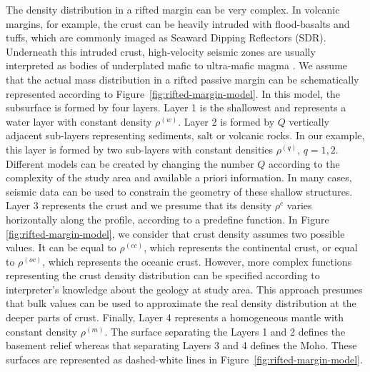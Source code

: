 \documentclass[manuscript]{geophysics}
\begin{document}
The density distribution in a rifted margin can be very complex.
In volcanic margins, for example, the crust can be heavily intruded with
flood-basalts and tuffs, which are commonly imaged as Seaward Dipping Reflectors (SDR).
Underneath this intruded crust, high-velocity seismic zones are usually interpreted 
as bodies of underplated mafic to ultra-mafic magma \citep{geoffroy2005}.
We assume that the actual mass distribution in a rifted passive margin can be 
schematically represented according to Figure~\ref{fig:rifted-margin-model}. 
In this model, the subsurface is formed by four layers. 
Layer 1 is the shallowest and represents a water layer with constant density
$\rho^{(w)}$. 
Layer 2 is formed by $Q$ vertically adjacent sub-layers representing 
sediments, salt or volcanic rocks.
In our example, this layer is formed by two sub-layers with constant densities
$\rho^{(q)}$, $q = 1, 2$. Different models can be created by changing the number $Q$
according to the complexity of the study area and available a priori information.
In many cases, seismic data can be used to constrain the geometry of these 
shallow structures.
Layer 3 represents the crust and we presume that its density $\rho^{c}$
varies horizontally along the profile, according to a predefine function.
In Figure \ref{fig:rifted-margin-model}, we consider that crust density assumes 
two possible values. It can be equal to $\rho^{(cc)}$, which
represents the continental crust, or equal to $\rho^{(oc)}$, which represents the
oceanic crust.
However, more complex functions representing the crust density distribution can be
specified according to interpreter's knowledge about the geology at study area.
This approach presumes that bulk values can be used 
to approximate the real density distribution at the deeper parts of crust. 
Finally, Layer 4 represents a homogeneous mantle with constant density $\rho^{(m)}$. 
The surface separating the Layers 1 and 2 defines the basement relief whereas
that separating Layers 3 and 4 defines the Moho. These surfaces are
represented as dashed-white lines in Figure~\ref{fig:rifted-margin-model}.
\end{document}
